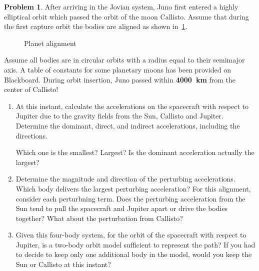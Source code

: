 \documentclass[10pt]{article}
\theoremstyle{definition}
\newtheorem{prob}{Problem}[section]
\newenvironment{subprob}%
{\renewcommand{\theenumi}{\alph{enumi}}\renewcommand{\labelenumi}{(\theenumi)}\begin{enumerate}}%
{\end{enumerate}}%
\begin{document}
\begin{prob}
    After arriving in the Jovian system, Juno first entered a highly elliptical orbit which passed the orbit of the moon Callisto.
    Assume that during the first capture orbit the bodies are aligned as shown in~\cref{fig:planets}.
    \begin{figure}[htbp]
        \centering
        \caption{Planet alignment~\label{fig:planets}}
    \end{figure}
    
    Assume all bodies are in circular orbits with a radius equal to their semimajor axis. 
    A table of constants for some planetary moons has been provided on Blackboard.
    During orbit insertion, Juno passed within \textbf{\SI{4000}{\kilo\meter}} from the center of Callisto!

    \begin{subprob}
        \item At this instant, calculate the accelerations on the spacecraft with respect to Jupiter due to the gravity fields from the Sun, Callisto and Jupiter.
            Determine the dominant, direct, and indirect accelerations, including the directions. 

            Which one is the smallest? Largest? Is the dominant acceleration actually the largest?

        \item Determine the magnitude and direction of the perturbing accelerations. 
            Which body delivers the largest perturbing acceleration?
            For this alignment, consider each perturbning term. 
            Does the perturbing acceleration from the Sun tend to pull the spacecraft and Jupiter apart or drive the bodies together?
            What about the perturbation from Callisto?

        \item Given this four-body system, for the orbit of the spacecraft with respect to Jupiter, is a two-body orbit model sufficient to represent the path?
            If you had to decide to keep only one additional body in the model, would you keep the Sun or Callisto at this instant?
    \end{subprob}
    

\end{prob}
\end{document}
